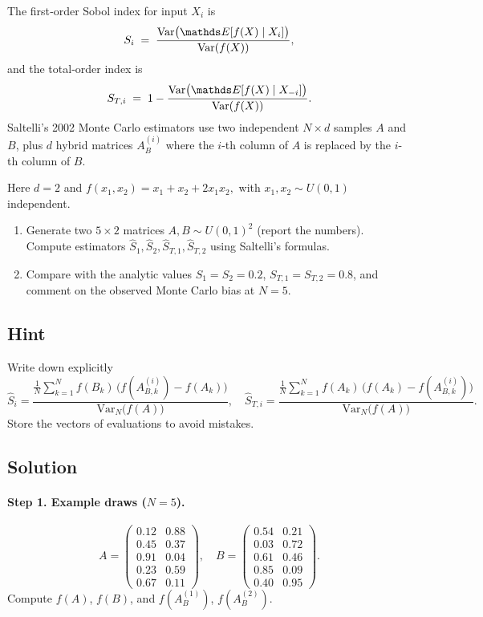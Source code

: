 \documentclass[a4paper]{article}
\begin{document}
The first‐order Sobol index for input $X_i$ is
\[
S_i \;=\; \frac{\text{Var}\bigl(\E[f(X)\mid X_i]\bigr)}{\text{Var}(f(X))},
\]
and the total‐order index is
\[
S_{T,i} \;=\; 1 - \frac{\text{Var}\bigl(\E[f(X) \mid X_{-i}]\bigr)}{\text{Var}(f(X))}.
\]
Saltelli’s 2002 Monte Carlo estimators use two independent $N\times d$
samples $A$ and $B$, plus $d$ hybrid matrices $A^{(i)}_B$ where the
$i$-th column of $A$ is replaced by the $i$-th column of $B$.

Here $d=2$ and
\(
f(x_1,x_2)=x_1+x_2+2x_1x_2,
\)
with $x_1,x_2\sim U(0,1)$ independent.

\begin{enumerate}%
  \item Generate two $5\times2$ matrices $A,B\sim U(0,1)^2$ (report the numbers).
        Compute estimators
        \(\hat S_1,\hat S_2,\hat S_{T,1},\hat S_{T,2}\)
        using Saltelli’s formulas.
  \item Compare with the analytic values
        \(S_1=S_2=0.2\), \(S_{T,1}=S_{T,2}=0.8\),
        and comment on the observed Monte Carlo bias at $N=5$.
\end{enumerate}

\subsection*{Hint}
Write down explicitly
\[
\hat S_i
= \frac{\tfrac1N\sum_{k=1}^N f(B_k)\,\bigl(f(A^{(i)}_{B,k})-f(A_k)\bigr)}
       {\text{Var}_N\bigl(f(A)\bigr)},
\quad
\hat S_{T,i}
= \frac{\tfrac1N\sum_{k=1}^N f(A_k)\,\bigl(f(A_k)-f(A^{(i)}_{B,k})\bigr)}
       {\text{Var}_N\bigl(f(A)\bigr)}.
\]
Store the vectors of evaluations to avoid mistakes.

\subsection*{Solution}

\paragraph{Step 1. Example draws ($N=5$).}
\[
A =
\begin{pmatrix}
0.12 & 0.88\\
0.45 & 0.37\\
0.91 & 0.04\\
0.23 & 0.59\\
0.67 & 0.11
\end{pmatrix},
\quad
B =
\begin{pmatrix}
0.54 & 0.21\\
0.03 & 0.72\\
0.61 & 0.46\\
0.85 & 0.09\\
0.40 & 0.95
\end{pmatrix}.
\]
Compute $f(A)$, $f(B)$, and $f(A^{(1)}_B)$, $f(A^{(2)}_B)$.
\end{document}
